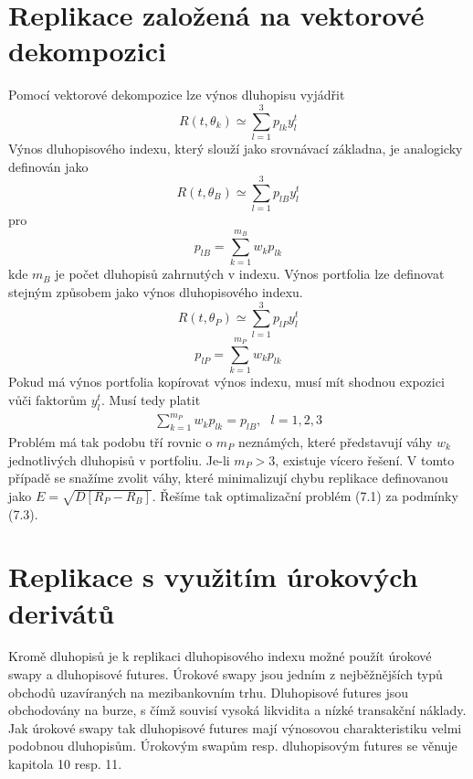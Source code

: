 \documentclass[a4paper]{book}
\begin{document}
\section{Replikace založená na vektorové dekompozici}

Pomocí vektorové dekompozice lze výnos dluhopisu vyjádřit
\begin{equation*}
R(t, \theta_k) \simeq \sum_{l = 1}^3 p_{lk} y_l^t
\end{equation*}
Výnos dluhopisového indexu, který slouží jako srovnávací základna, je analogicky definován jako
\begin{equation*}
R(t, \theta_B) \simeq \sum_{l = 1}^3 p_{lB} y_l^t
\end{equation*}
pro
\begin{equation*}
p_{lB} = \sum_{k=1}^{m_B} w_k p_{lk}
\end{equation*}
kde $m_B$ je počet dluhopisů zahrnutých v indexu. Výnos portfolia lze definovat stejným způsobem jako výnos dluhopisového indexu.
\begin{equation*}
R(t, \theta_P) \simeq \sum_{l = 1}^3 p_{lP} y_l^t
\end{equation*}
\begin{equation*}
p_{lP} = \sum_{k=1}^{m_P} w_k p_{lk}
\end{equation*}
Pokud má výnos portfolia kopírovat výnos indexu, musí mít shodnou expozici vůči faktorům $y_l^t$. Musí tedy platit
\begin{gather}
\sum_{k=1}^{m_P} w_k p_{lk} = p_{lB}, ~~~ l = 1,2,3
\end{gather}
Problém má tak podobu tří rovnic o $m_P$ neznámých, které představují váhy $w_k$ jednotlivých dluhopisů v portfoliu. Je-li $m_P > 3$, existuje vícero řešení. V tomto případě se snažíme zvolit váhy, které minimalizují chybu replikace definovanou jako $E = \sqrt{D[R_P - R_B]}$. Řešíme tak optimalizační problém (7.1) za podmínky (7.3).

\section{Replikace s využitím úrokových derivátů}

Kromě dluhopisů je k replikaci dluhopisového indexu možné použít úrokové swapy a dluhopisové futures. Úrokové swapy jsou jedním z nejběžnějších typů obchodů uzavíraných na mezibankovním trhu. Dluhopisové futures jsou obchodovány na burze, s čímž souvisí vysoká likvidita a nízké transakční náklady. Jak úrokové swapy tak dluhopisové futures mají výnosovou charakteristiku velmi podobnou dluhopisům. Úrokovým swapům resp. dluhopisovým futures se věnuje kapitola 10 resp. 11.
\end{document}
